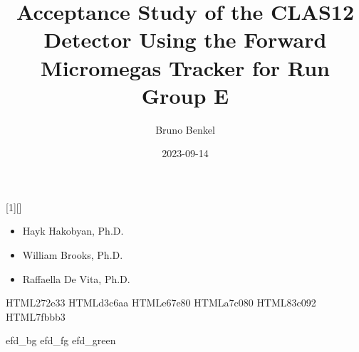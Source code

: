 
\title{Acceptance Study of the CLAS12 Detector Using the Forward Micromegas Tracker for Run Group E}
\author{Bruno Benkel}
\date{2023-09-14}

[1][]
{
    \vspace{21pt}

    \begin{center}
        \textbf{\inserttitle}\par
        \insertauthor\par
    \end{center}

    \vspace{48pt}

    \begin{itemize}
        \item[]
            Hayk Hakobyan, Ph.D.

        \item[]
            William Brooks, Ph.D.

        \item[]
            Raffaella De Vita, Ph.D.
    \end{itemize}

    \begin{flushright}
        \insertdate\par
    \end{flushright}

    \vfill
}


\definecolor{efd_bg}    {HTML}{272e33}
\definecolor{efd_fg}    {HTML}{d3c6aa}
\definecolor{efd_red}   {HTML}{e67e80}
\definecolor{efd_green} {HTML}{a7c080}
\definecolor{efd_aqua}  {HTML}{83c092}
\definecolor{efd_blue}  {HTML}{7fbbb3}

 {efd_bg}      %
 {efd_fg}      %
 {efd_green}   %

